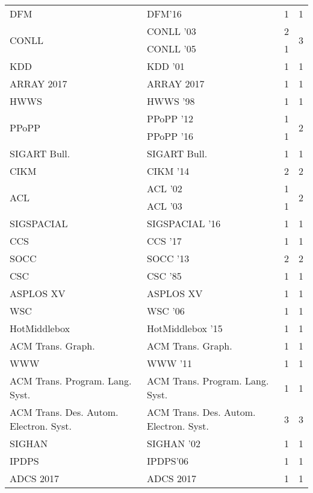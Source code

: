 \begin{table*}[t]
\begin{tabular}{llrr}
\multirow{1}{*}{DFM} & DFM'16 & 1 & \multirow{1}{*}{1}\\
\multirow{2}{*}{CONLL } & CONLL '03 & 2 & \multirow{2}{*}{3}\\
& CONLL '05 & 1 &\\
\multirow{1}{*}{KDD } & KDD '01 & 1 & \multirow{1}{*}{1}\\
\multirow{1}{*}{ARRAY 2017} & ARRAY 2017 & 1 & \multirow{1}{*}{1}\\
\multirow{1}{*}{HWWS } & HWWS '98 & 1 & \multirow{1}{*}{1}\\
\multirow{2}{*}{PPoPP } & PPoPP '12 & 1 & \multirow{2}{*}{2}\\
& PPoPP '16 & 1 &\\
\multirow{1}{*}{SIGART Bull.} & SIGART Bull. & 1 & \multirow{1}{*}{1}\\
\multirow{1}{*}{CIKM } & CIKM '14 & 2 & \multirow{1}{*}{2}\\
\multirow{2}{*}{ACL } & ACL '02 & 1 & \multirow{2}{*}{2}\\
& ACL '03 & 1 &\\
\multirow{1}{*}{SIGSPACIAL } & SIGSPACIAL '16 & 1 & \multirow{1}{*}{1}\\
\multirow{1}{*}{CCS } & CCS '17 & 1 & \multirow{1}{*}{1}\\
\multirow{1}{*}{SOCC } & SOCC '13 & 2 & \multirow{1}{*}{2}\\
\multirow{1}{*}{CSC } & CSC '85 & 1 & \multirow{1}{*}{1}\\
\multirow{1}{*}{ASPLOS XV} & ASPLOS XV & 1 & \multirow{1}{*}{1}\\
\multirow{1}{*}{WSC } & WSC '06 & 1 & \multirow{1}{*}{1}\\
\multirow{1}{*}{HotMiddlebox } & HotMiddlebox '15 & 1 & \multirow{1}{*}{1}\\
\multirow{1}{*}{ACM Trans. Graph.} & ACM Trans. Graph. & 1 & \multirow{1}{*}{1}\\
\multirow{1}{*}{WWW } & WWW '11 & 1 & \multirow{1}{*}{1}\\
\multirow{1}{*}{ACM Trans. Program. Lang. Syst.} & ACM Trans. Program. Lang. Syst. & 1 & \multirow{1}{*}{1}\\
\multirow{1}{*}{ACM Trans. Des. Autom. Electron. Syst.} & ACM Trans. Des. Autom. Electron. Syst. & 3 & \multirow{1}{*}{3}\\
\multirow{1}{*}{SIGHAN } & SIGHAN '02 & 1 & \multirow{1}{*}{1}\\
\multirow{1}{*}{IPDPS} & IPDPS'06 & 1 & \multirow{1}{*}{1}\\
\multirow{1}{*}{ADCS 2017} & ADCS 2017 & 1 & \multirow{1}{*}{1}\\

\end{tabular}
\end{table*}
